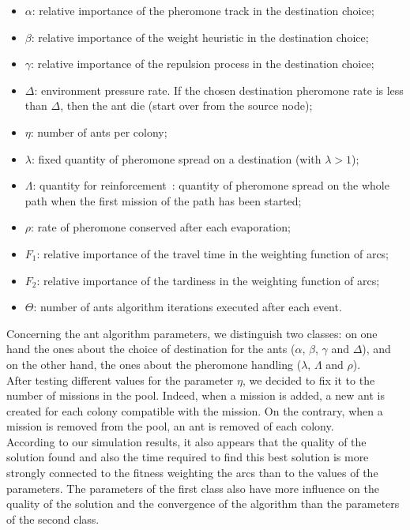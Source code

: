 \documentclass[review]{elsarticle}
\begin{document}
\begin{itemize}
 \item $\alpha$: relative importance of the pheromone track in the destination choice;
 \item $\beta$:  relative importance of the weight heuristic in the destination choice;
 \item $\gamma$: relative importance of the repulsion process in the destination choice;
 \item $\Delta$: environment pressure rate. If the chosen destination pheromone rate is less than $\Delta$, then the ant die (start over from the source node);
 \item $\eta$: number of ants per colony;
 \item $\lambda$: fixed quantity of pheromone spread on a destination (with $\lambda > 1$);
 \item $\Lambda$: quantity for reinforcement : quantity of pheromone spread on the whole path when the first mission of the path has been started;
 \item $\rho$: rate of pheromone conserved after each evaporation;
 \item $F_1$: relative importance of the travel time in the weighting function of arcs;
 \item $F_2$: relative importance of the tardiness in the weighting function of arcs;
 \item $\Theta$: number of ants algorithm iterations executed after each event.
\end{itemize}

Concerning the ant algorithm parameters, we distinguish two classes: on one hand the ones about the choice of destination for the ants ($\alpha$, $\beta$, $\gamma$ and $\Delta$), and on the other hand, the ones about the pheromone handling ($\lambda$, $\Lambda$ and $\rho$).\\

After testing different values for the parameter $\eta$, we decided to fix it to the number of missions in the pool. Indeed, when a mission is added, a new ant is created for each colony compatible with the mission. On the contrary, when a mission is removed from the pool, an ant is removed of each colony.\\

According to our simulation results, it also appears that the quality of the solution found and also the time required to find this best solution is more strongly connected to the fitness weighting the arcs than to the values of the parameters. The parameters of the first class also have more influence on the quality of the solution and the convergence of the algorithm than the parameters of the second class.
\end{document}

